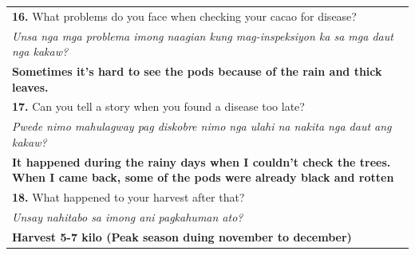 {\begin{longtable}{|p{4cm}|p{10cm}|}
		\multicolumn{2}{|p{12cm}|}{\vspace{0.1cm} \textbf{16.} What problems do you face when checking your cacao for disease?}                                                                \\
		\multicolumn{2}{|p{12cm}|}{\textit{Unsa nga mga problema imong naagian kung mag-inspeksiyon ka sa mga daut nga kakaw?}}                                                                \\
		\multicolumn{2}{|p{12cm}|}{\textbf{Sometimes it’s hard to see the pods because of the rain and thick leaves.}}                                                                         \\

		\multicolumn{2}{|p{12cm}|}{\vspace{0.1cm} \textbf{17.} Can you tell a story when you found a disease too late?}                                                                        \\
		\multicolumn{2}{|p{12cm}|}{\textit{Pwede nimo mahulagway pag diskobre nimo nga ulahi na nakita nga daut ang kakaw?}}                                                                   \\
		\multicolumn{2}{|p{12cm}|}{\textbf{It happened during the rainy days when I couldn’t check the trees. When I came back, some of the pods were already black and rotten}}               \\

		\multicolumn{2}{|p{12cm}|}{\vspace{0.1cm} \textbf{18.} What happened to your harvest after that?}                                                                                      \\
		\multicolumn{2}{|p{12cm}|}{\textit{Unsay nahitabo sa imong ani pagkahuman ato?}}                                                                                                       \\
		\multicolumn{2}{|p{12cm}|}{\textbf{Harvest 5-7 kilo (Peak season duing november to december)}}                                                                                         \\ \hline


\end{longtable}}
